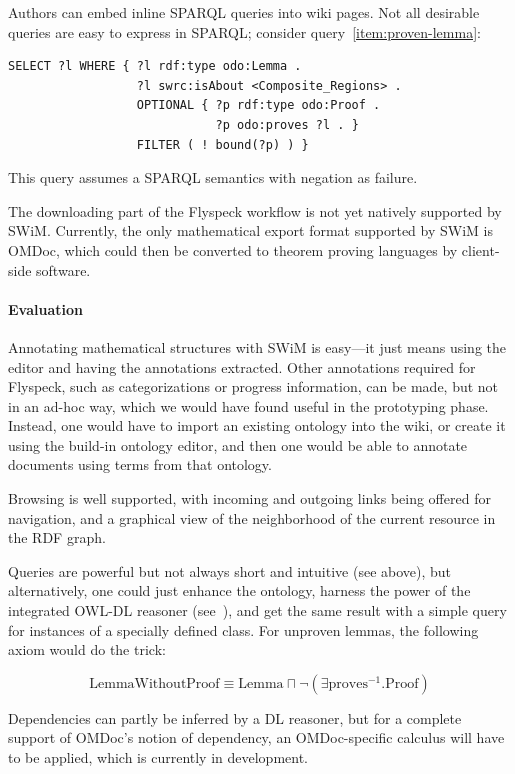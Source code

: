Authors can embed inline SPARQL queries into wiki pages.  Not all desirable
queries are easy to express in SPARQL; consider query~\ref{item:proven-lemma}:

\begin{lstlisting}
SELECT ?l WHERE { ?l rdf:type odo:Lemma .
                  ?l swrc:isAbout <Composite_Regions> .
                  OPTIONAL { ?p rdf:type odo:Proof .
                             ?p odo:proves ?l . }
                  FILTER ( ! bound(?p) ) }
\end{lstlisting}

This query assumes a SPARQL semantics with negation as
failure\cite{Polleres:SPARQL-Rules07}.

The downloading part of the Flyspeck workflow is not yet natively supported by
SWiM.  Currently, the only mathematical export format supported by SWiM is
OMDoc, which could then be converted to theorem proving languages by client-side
software\cite[chap.\ 25.2]{Kohlhase:omdoc1.2}.

\paragraph{Evaluation} Annotating mathematical structures with SWiM is easy---it
just means using the editor and having the annotations extracted.  Other
annotations required for Flyspeck, such as categorizations or progress
information, can be made, but not in an ad-hoc way, which we would have found
useful in the prototyping phase.  Instead, one would have to import an existing
ontology into the wiki, or create it using the build-in ontology editor, and
then one would be able to annotate documents using terms from that ontology.

Browsing is well supported, with incoming and outgoing links being offered for
navigation, and a graphical view of the neighborhood of the current resource in
the RDF graph.

Queries are powerful but not always short and intuitive (see above), but
alternatively, one could just enhance the ontology, harness the power of the
integrated  OWL-DL reasoner
(see~\cite{KrSchVr:semwiki-reasoning07}), and get the same result with a simple
query for instances of a specially defined class.  For unproven lemmas, the
following axiom would do the trick:

\[
\mbox{LemmaWithoutProof}\equiv\mbox{Lemma}\sqcap\neg(\exists\mbox{proves}^{-1}.\mbox{Proof})
\]

Dependencies can partly be inferred by a DL reasoner, but for a complete support
of OMDoc's notion of dependency, an OMDoc-specific calculus will have to be
applied, which is currently in development.

